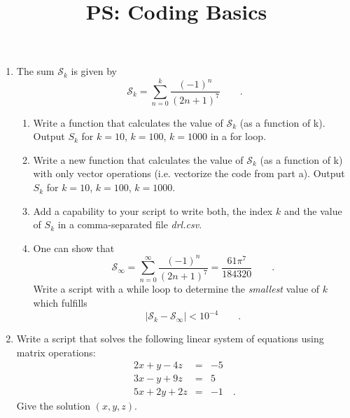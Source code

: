 \documentclass{article}
\title{\vspace{-1in} PS: Coding Basics}
\date{}
\newcommand{\beq}{\begin{equation*}}
\newcommand{\eeq}{\end{equation*}}
\newcommand{\be}{\begin{enumerate}}
\newcommand{\ee}{\end{enumerate}}
\begin{document}
\maketitle

\be
 \item The sum $\mathcal{S}_k$ is given by
\beq
\mathcal{S}_k= 
\sum_{n=0}^k \frac{(-1)^n}{(2n+1)^7}\qquad .
\eeq

\be
\item Write a function that calculates the value of $\mathcal{S}_k$ (as a function of k). Output $S_k$ for $k=10$, $k=100$, $k=1000$ in a for loop. 
\item Write a new function that calculates the value of $\mathcal{S}_k$ (as a function of k) with only vector operations (i.e. vectorize the code from part a). Output $S_k$ for $k=10$, $k=100$, $k=1000$. 
\item Add a capability to your script to write both, the index $k$ and the value of $S_k$ in a comma-separated file \emph{drl.csv}.
\item One can show that
\beq
\mathcal{S}_\infty= 
\sum_{n=0}^\infty\frac{(-1)^n}{(2n+1)^7}=\frac{61\pi^7}{184320}\qquad .
\eeq
Write a script with a while loop to determine the \emph{smallest} value of $k$ which fulfills 
\beq
\left|\mathcal{S}_k-\mathcal{S}_\infty \right|< 10^{-4}\qquad.
\eeq
\ee
\item Write a script that solves the following linear system of equations using matrix operations:
\begin{eqnarray*}
2x+y-4z & = & -5 \\
3x-y+9z &=& 5\\
5x+2y + 2z &=& -1\quad .
\end{eqnarray*}
Give the solution $(x,y,z)$.


\ee 
\end{document}
